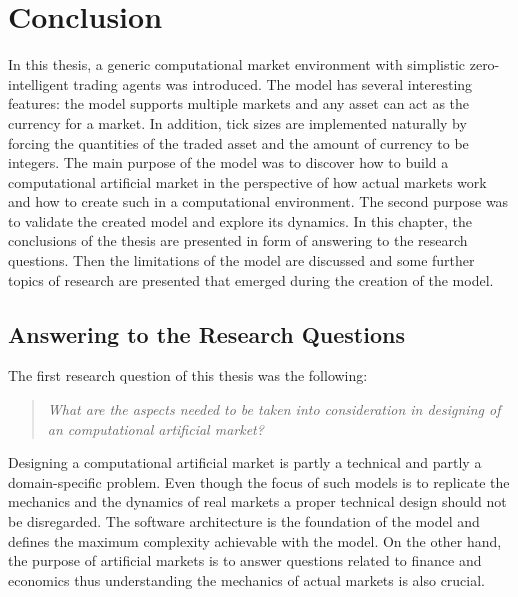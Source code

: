 

\section{Conclusion}

In this thesis, a generic computational market environment with simplistic
zero-intelligent trading agents was introduced. The model has several interesting features: 
the model supports multiple markets and any asset can act as the currency
for a market. In addition, tick sizes are implemented naturally by forcing
the quantities of the traded asset and the amount of currency to be integers.
The main purpose of the model was to discover how to build a computational artificial market 
in the perspective of how actual markets work and how to create such in a computational environment. 
The second purpose was to validate the created model and explore its dynamics.
In this chapter, the conclusions of the thesis are presented in form of answering to the 
research questions. Then the limitations of the model are discussed and some further topics 
of research are presented that emerged during the creation of the model.


\subsection{Answering to the Research Questions}

The first research question of this thesis was the following:
\begin{quote}
\textit{What are the aspects needed to be taken into consideration in designing of an computational 
artificial market?} 
\end{quote}
Designing a computational artificial market is partly a technical and partly a domain-specific 
problem. Even though the focus of such models is to replicate the mechanics and the dynamics 
of real markets a proper technical design should not be disregarded. The software architecture 
is the foundation of the model and defines the maximum complexity achievable with the model. 
On the other hand, the purpose of artificial markets is to answer questions related to 
finance and economics thus understanding the mechanics of actual markets is also crucial. 

